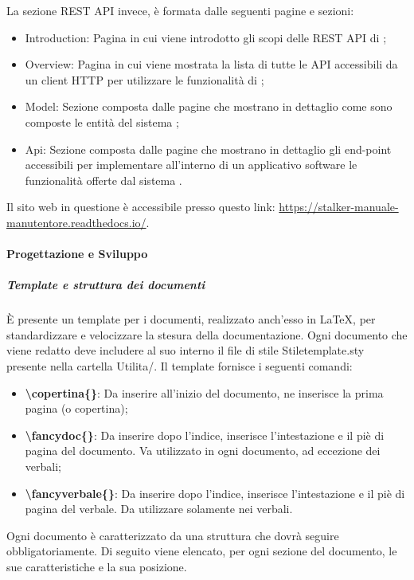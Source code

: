 La sezione REST API invece, è formata dalle seguenti pagine e sezioni:
\begin{itemize}
    \item Introduction: Pagina in cui viene introdotto gli scopi delle REST API di \NomeProgetto{};
    \item Overview: Pagina in cui viene mostrata la lista di tutte le API accessibili da un client HTTP per utilizzare le funzionalità di \NomeProgetto{};
    \item Model: Sezione composta dalle pagine che mostrano in dettaglio come sono composte le entità del sistema \NomeProgetto{};
    \item Api: Sezione composta dalle pagine che mostrano in dettaglio gli end-point accessibili per implementare all'interno di un applicativo software le funzionalità offerte dal sistema \NomeProgetto{}.
\end{itemize}

Il sito web in questione è accessibile presso questo link: \href{https://stalker-manuale-manutentore.readthedocs.io/}{https://stalker-manuale-manutentore.readthedocs.io/}.

\paragraph*{Progettazione e Sviluppo}

\subparagraph*{Template e struttura dei documenti}
È presente un template per i documenti, realizzato anch'esso in \LaTeX{}, per standardizzare e velocizzare la stesura della documentazione.
Ogni documento che viene redatto deve includere al suo interno il file di stile Stiletemplate.sty presente nella cartella Utilita/.
Il template fornisce i seguenti comandi:
\begin{itemize}
\item \textbf{\textbackslash copertina\{\}}: Da inserire all'inizio del documento, ne inserisce la prima pagina (o copertina);
\item \textbf{\textbackslash fancydoc\{\}}: Da inserire dopo l'indice, inserisce l'intestazione e il piè di pagina del documento. Va utilizzato in ogni documento, ad eccezione dei verbali;
\item \textbf{\textbackslash fancyverbale\{\}}: Da inserire dopo l'indice, inserisce l'intestazione e il piè di pagina del verbale. Da utilizzare solamente nei verbali.
\end{itemize}

Ogni documento è caratterizzato da una struttura che dovrà seguire obbligatoriamente.
Di seguito viene elencato, per ogni sezione del documento, le sue caratteristiche e la sua posizione.

